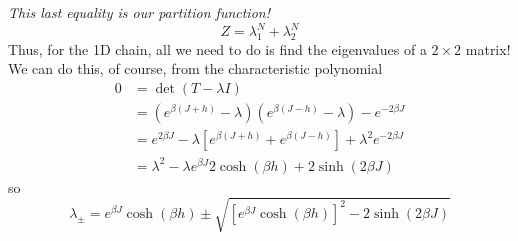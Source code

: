 \emph{This last equality is our partition function!}
\begin{equation}
	Z = \lambda_1^N+\lambda_2^N
\end{equation}
Thus, for the 1D chain, all we need to do is find the eigenvalues of a \(2\times 2\) matrix! We can do this, of course, from the characteristic polynomial
\begin{align*}
	0&=\det(T-\lambda I)\\
	 &=(e^{\beta (J+h)}-\lambda)(e^{\beta(J-h)}-\lambda)-e^{-2\beta J}\\
	 &= e^{2\beta J} -\lambda\left[e^{\beta(J+h)}+e^{\beta(J-h)}\right]+\lambda^2 e^{-2\beta J}\\
	 &=\lambda^2 -\lambda e^{\beta J}2\cosh(\beta h) +2\sinh (2\beta J)
\end{align*}
so
\begin{equation}
\lambda_\pm = e^{\beta J}\cosh(\beta h)\pm \sqrt{[e^{\beta J}\cosh(\beta h)]^2-2\sinh(2\beta J)}
\end{equation}

